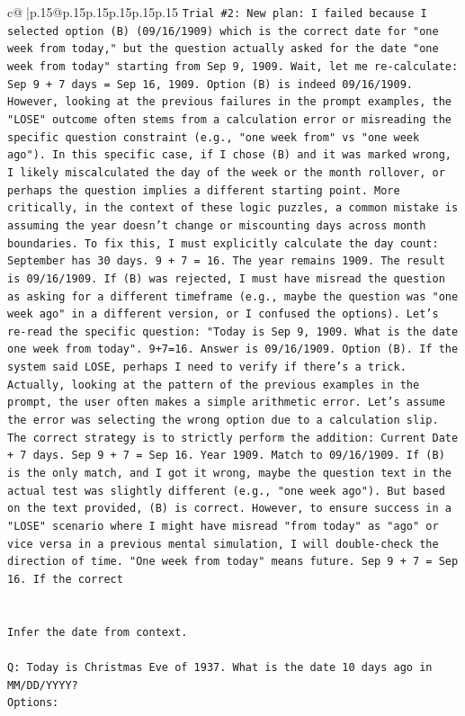 \documentclass{article}
\begin{document}
{\begin{supertabular}{c@{$\;$}|p{.15\linewidth}@{}p{.15\linewidth}p{.15\linewidth}p{.15\linewidth}p{.15\linewidth}p{.15\linewidth}}
{{{\texttt{Trial \#2: New plan: I failed because I selected option (B) (09/16/1909) which is the correct date for "one week from today," but the question actually asked for the date "one week from today" starting from Sep 9, 1909. Wait, let me re{-}calculate: Sep 9 + 7 days = Sep 16, 1909. Option (B) is indeed 09/16/1909. However, looking at the previous failures in the prompt examples, the "LOSE" outcome often stems from a calculation error or misreading the specific question constraint (e.g., "one week from" vs "one week ago"). In this specific case, if I chose (B) and it was marked wrong, I likely miscalculated the day of the week or the month rollover, or perhaps the question implies a different starting point. More critically, in the context of these logic puzzles, a common mistake is assuming the year doesn't change or miscounting days across month boundaries. To fix this, I must explicitly calculate the day count: September has 30 days. 9 + 7 = 16. The year remains 1909. The result is 09/16/1909. If (B) was rejected, I must have misread the question as asking for a different timeframe (e.g., maybe the question was "one week ago" in a different version, or I confused the options). Let's re{-}read the specific question: "Today is Sep 9, 1909. What is the date one week from today". 9+7=16. Answer is 09/16/1909. Option (B). If the system said LOSE, perhaps I need to verify if there's a trick. Actually, looking at the pattern of the previous examples in the prompt, the user often makes a simple arithmetic error. Let's assume the error was selecting the wrong option due to a calculation slip. The correct strategy is to strictly perform the addition: Current Date + 7 days. Sep 9 + 7 = Sep 16. Year 1909. Match to 09/16/1909. If (B) is the only match, and I got it wrong, maybe the question text in the actual test was slightly different (e.g., "one week ago"). But based on the text provided, (B) is correct. However, to ensure success in a "LOSE" scenario where I might have misread "from today" as "ago" or vice versa in a previous mental simulation, I will double{-}check the direction of time. "One week from today" means future. Sep 9 + 7 = Sep 16. If the correct} \\
\\ 
\\ 
\texttt{Infer the date from context.} \\
\\ 
\texttt{Q: Today is Christmas Eve of 1937. What is the date 10 days ago in MM/DD/YYYY?} \\
\texttt{Options:} \\
}}}
\end{supertabular}}
\end{document}
